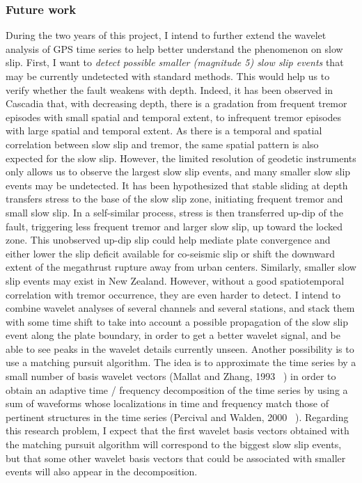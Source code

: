 \documentclass[letterpaper, 12pt]{article}
\begin{document}
\subsubsection*{Future work}

During the two years of this project, I intend to further extend the wavelet analysis of GPS time series to help better understand the phenomenon on slow slip. First, I want to \emph{detect possible smaller (magnitude 5) slow slip events} that may be currently undetected with standard methods. This would help us to verify whether the fault weakens with depth. Indeed, it has been observed in Cascadia that, with decreasing depth, there is a gradation from frequent tremor episodes with small spatial and temporal extent, to infrequent tremor episodes with large spatial and temporal extent. As there is a temporal and spatial correlation between slow slip and tremor, the same spatial pattern is also expected for the slow slip. However, the limited resolution of geodetic instruments only allows us to observe the largest slow slip events, and many smaller slow slip events may be undetected. It has been hypothesized that stable sliding at depth transfers stress to the base of the slow slip zone, initiating frequent tremor and small slow slip. In a self-similar process, stress is then transferred up-dip of the fault, triggering less frequent tremor and larger slow slip, up toward the locked zone. This unobserved up-dip slip could help mediate plate convergence and either lower the slip deficit available for co-seismic slip or shift the downward extent of the megathrust rupture away from urban centers. Similarly, smaller slow slip events may exist in New Zealand. However, without a good spatiotemporal correlation with tremor occurrence, they are even harder to detect. I intend to combine wavelet analyses of several channels and several stations, and stack them with some time shift to take into account a possible propagation of the slow slip event along the plate boundary, in order to get a better wavelet signal, and be able to see peaks in the wavelet details currently unseen. Another possibility is to use a matching pursuit algorithm. The idea is to approximate the time series by a small number of basis wavelet vectors (Mallat and Zhang, 1993 ~\cite{MAL_1993}) in order to obtain an adaptive time / frequency decomposition of the time series by using a sum of waveforms whose localizations in time and frequency match those of pertinent structures in the time series (Percival and Walden, 2000 ~\cite{PER_2000}). Regarding this research problem, I expect that the first wavelet basis vectors obtained with the matching pursuit algorithm will correspond to the biggest slow slip events, but that some other wavelet basis vectors that could be associated with smaller events will also appear in the decomposition.
\end{document}
